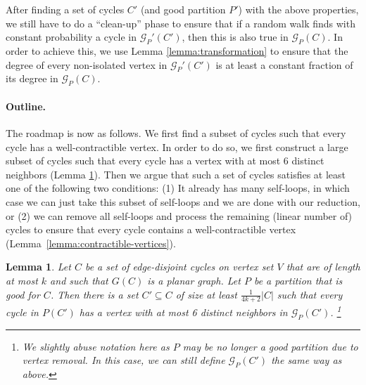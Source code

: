 \documentclass[11pt]{article}
\newtheorem{lemma}[theorem]{Lemma}
\begin{document}
After finding a set of cycles $C'$ (and good partition $P'$) with the above properties, we still have to do a  ``clean-up'' phase
to ensure that if a random walk finds with constant probability a cycle in $\mathcal G_P'(C')$, then this is also true in $\mathcal G_P(C)$. In order to achieve this, we use Lemma \ref{lemma:transformation} to ensure that the degree of every non-isolated vertex in $\mathcal G_P'(C')$ is at least a constant fraction of its degree in $\mathcal G_P(C)$.



\paragraph{Outline.}

The roadmap is now as follows. We first find a subset of cycles such that every cycle has a well-contractible vertex. In order to do so, we first construct a large subset of cycles such that every cycle has a vertex with at most {6} distinct neighbors (Lemma \ref{lemma:small-vertices}). Then we argue that such a set of cycles satisfies at least one of the following two conditions: (1) It already has many self-loops, in which case we can just take this subset of self-loops and we are done with our reduction, or (2) we can remove all self-loops and process the remaining (linear number of) cycles to ensure that every cycle contains a well-contractible vertex (Lemma~\ref{lemma:contractible-vertices}).

\begin{lemma}
\label{lemma:small-vertices}
Let $C$ be a set of edge-disjoint cycles on vertex set $V$ that are of length at most $k$ and such that $G(C)$ is a planar graph. Let $P$ be a partition that is good for $C$. Then there is a set $C' \subseteq C$ of size at least $\frac{1}{4k+2} |C|$ such that every cycle in $P(C')$ has a vertex with at most 6 distinct neighbors in $\mathcal G_{P}(C')$.
\footnote{We slightly abuse notation here as $P$ may be no longer a good partition due to vertex removal. In this case, we can still define $\mathcal G_{P}(C')$ the same way as above.}
\end{lemma}
\end{document}
